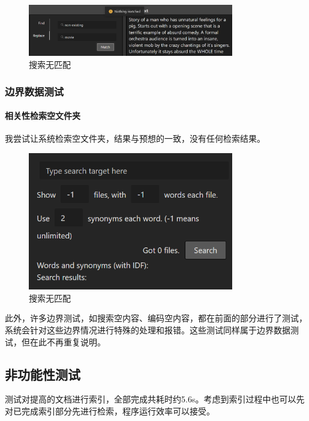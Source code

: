 \documentclass[scheme = chinese]{ctexart}
\begin{document}
\begin{figure}[H]
    \centering
    \includegraphics[width=0.8\textwidth]{images/问题-搜索无匹配.png}
    \caption{搜索无匹配}
\end{figure}

\subsubsection{边界数据测试}

\paragraph{相关性检索空文件夹}
我尝试让系统检索空文件夹，结果与预想的一致，没有任何检索结果。

\begin{figure}[H]
    \centering
    \includegraphics[width=0.8\textwidth]{images/测试-检索空文件夹.png}
    \caption{搜索无匹配}
\end{figure}

此外，许多边界测试，如搜索空内容、编码空内容，都在前面的部分进行了测试，系统会针对这些边界情况进行特殊的处理和报错。这些测试同样属于边界数据测试，但在此不再重复说明。

\clearpage

\subsection{非功能性测试}
测试对提高的文档进行索引，全部完成共耗时约5.6s。考虑到索引过程中也可以先对已完成索引部分先进行检索，程序运行效率可以接受。
\end{document}
